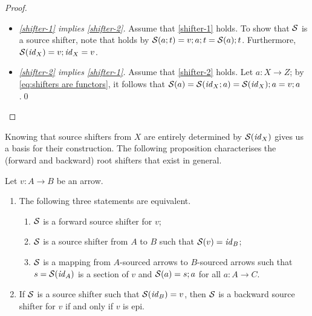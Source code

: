 \begin{proof}~
\begin{itemize}[topsep=\smallskipamount]
\item \emph{\ref{shifter-1} implies \ref{shifter-2}.}
%
Assume that \ref{shifter-1} holds. To show that  $\mathcal{S}$ is a source shifter, note that   holds by $\mathcal{S}(a;t)=v;a;t=\mathcal{S}(a);t$. Furthermore, $\mathcal{S}(\mathit{id}_X)=v;\mathit{id}_X=v$.

\item \emph{\ref{shifter-2} implies \ref{shifter-1}.}
%
Assume that \ref{shifter-2} holds. Let $a:X\to Z$; by \eqref{eq:shifters are functors}, it follows that $\mathcal{S}(a)=\mathcal{S}(\mathit{id}_X;a)=\mathcal{S}(\mathit{id}_X);a=v;a$.\qed
\end{itemize}
\end{proof}
%
Knowing that source shifters from $X$ are entirely determined by $\mathcal{S}(\mathit{id}_X)$ gives us a basis for their construction. The following proposition characterises the (forward and backward) root shifters that exist in general.
%
\begin{proposition}
Let $v:A\to B$ be an arrow.
\begin{enumerate}[topsep=\smallskipamount]
\item The following three statements are equivalent.
\begin{enumerate}[label=(\alph*),ref=\theenumi(\theenumii)]
\item\label{forward-1} $\mathcal{S}$ is a forward source shifter for $v$;
\item\label{forward-2} $\mathcal{S}$ is a source shifter from $A$ to $B$ such that $\mathcal{S}(v)=\mathit{id}_B$;
\item\label{forward-3} $\mathcal{S}$ is a mapping from $A$-sourced arrows to $B$-sourced arrows such that $s=\mathcal{S}(\mathit{id}_A)$ is a section of $v$ and $\mathcal{S}(a)=s;a$ for all $a:A\to C$.
\end{enumerate}
\item If $\mathcal{S}$ is a source shifter such that $\mathcal{S}(\mathit{id}_B)=v$, then $\mathcal{S}$ is a backward source shifter for $v$ if and only if $v$ is epi.
\end{enumerate}
\end{proposition}
%
